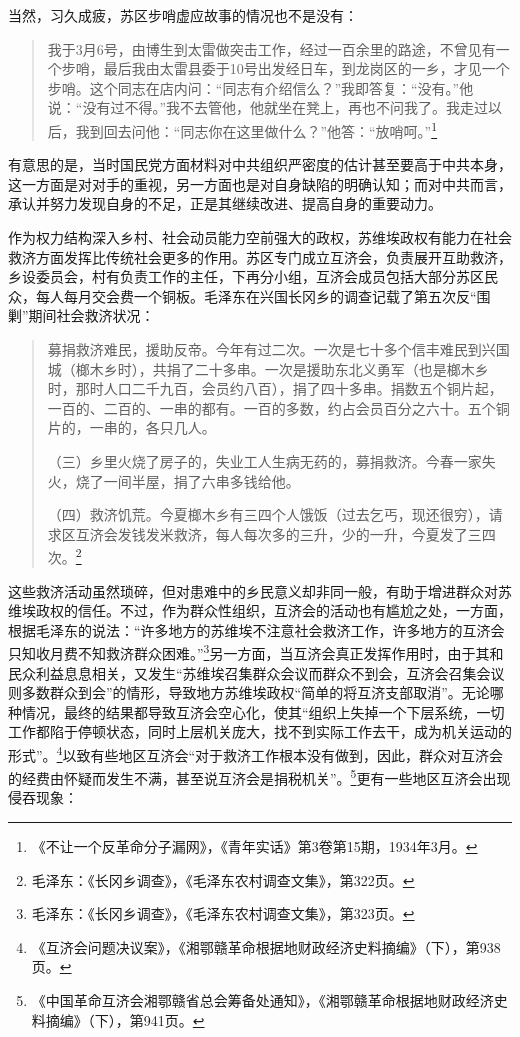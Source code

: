 当然，习久成疲，苏区步哨虚应故事的情况也不是没有：

\begin{quote}

我于3月6号，由博生到太雷做突击工作，经过一百余里的路途，不曾见有一个步哨，最后我由太雷县委于10号出发经日车，到龙岗区的一乡，才见一个步哨。这个同志在店内问：“同志有介绍信么？”我即答复：“没有。”他说：“没有过不得。”我不去管他，他就坐在凳上，再也不问我了。我走过以后，我到回去问他：“同志你在这里做什么？”他答：“放哨呵。”\footnote{《不让一个反革命分子漏网》，《青年实话》第3卷第15期，1934年3月。}
\end{quote}


有意思的是，当时国民党方面材料对中共组织严密度的估计甚至要高于中共本身，这一方面是对对手的重视，另一方面也是对自身缺陷的明确认知；而对中共而言，承认并努力发现自身的不足，正是其继续改进、提高自身的重要动力。


作为权力结构深入乡村、社会动员能力空前强大的政权，苏维埃政权有能力在社会救济方面发挥比传统社会更多的作用。苏区专门成立互济会，负责展开互助救济，乡设委员会，村有负责工作的主任，下再分小组，互济会成员包括大部分苏区民众，每人每月交会费一个铜板。毛泽东在兴国长冈乡的调查记载了第五次反“围剿”期间社会救济状况：

\begin{quote}

募捐救济难民，援助反帝。今年有过二次。一次是七十多个信丰难民到兴国城（榔木乡时），共捐了二十多串。一次是援助东北义勇军（也是榔木乡时，那时人口二千九百，会员约八百），捐了四十多串。捐数五个铜片起，一百的、二百的、一串的都有。一百的多数，约占会员百分之六十。五个铜片的，一串的，各只几人。

（三）乡里火烧了房子的，失业工人生病无药的，募捐救济。今春一家失火，烧了一间半屋，捐了六串多钱给他。

（四）救济饥荒。今夏榔木乡有三四个人饿饭（过去乞丐，现还很穷），请求区互济会发钱发米救济，每人每次多的三升，少的一升，今夏发了三四次。\footnote{毛泽东：《长冈乡调查》，《毛泽东农村调查文集》，第322页。}
\end{quote}


这些救济活动虽然琐碎，但对患难中的乡民意义却非同一般，有助于增进群众对苏维埃政权的信任。不过，作为群众性组织，互济会的活动也有尴尬之处，一方面，根据毛泽东的说法：“许多地方的苏维埃不注意社会救济工作，许多地方的互济会只知收月费不知救济群众困难。”\footnote{毛泽东：《长冈乡调查》，《毛泽东农村调查文集》，第323页。}另一方面，当互济会真正发挥作用时，由于其和民众利益息息相关，又发生“苏维埃召集群众会议而群众不到会，互济会召集会议则多数群众到会”的情形，导致地方苏维埃政权“简单的将互济支部取消”。无论哪种情况，最终的结果都导致互济会空心化，使其“组织上失掉一个下层系统，一切工作都陷于停顿状态，同时上层机关庞大，找不到实际工作去干，成为机关运动的形式”。\footnote{《互济会问题决议案》，《湘鄂赣革命根据地财政经济史料摘编》（下），第938页。}以致有些地区互济会“对于救济工作根本没有做到，因此，群众对互济会的经费由怀疑而发生不满，甚至说互济会是捐税机关”。\footnote{《中国革命互济会湘鄂赣省总会筹备处通知》，《湘鄂赣革命根据地财政经济史料摘编》（下），第941页。}更有一些地区互济会出现侵吞现象：

